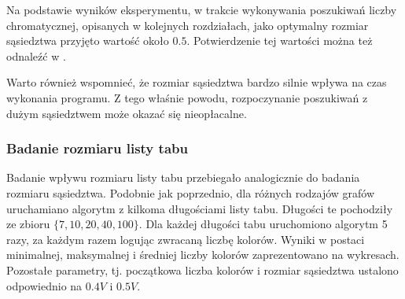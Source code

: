 \documentclass[12pt,a4paper]{article}
\begin{document}
Na podstawie wyników eksperymentu, w trakcie wykonywania poszukiwań liczby chromatycznej, opisanych w kolejnych rozdziałach, jako optymalny rozmiar sąsiedztwa przyjęto wartość około $0.5$. Potwierdzenie tej wartości można też odnaleźć w \cite{Hertz1987}.

Warto również wspomnieć, że rozmiar sąsiedztwa bardzo silnie wpływa na czas wykonania programu. Z tego właśnie powodu, rozpoczynanie poszukiwań z dużym sąsiedztwem może okazać się nieopłacalne.

\subsubsection{Badanie rozmiaru listy tabu}
Badanie wpływu rozmiaru listy tabu przebiegało analogicznie do badania rozmiaru sąsiedztwa. Podobnie jak poprzednio, dla różnych rodzajów grafów uruchamiano algorytm z kilkoma długościami listy tabu. Długości te pochodziły ze zbioru $\lbrace7,10,20,40,100\rbrace$. Dla każdej długości tabu uruchomiono algorytm 5 razy, za każdym razem logując zwracaną liczbę kolorów. Wyniki w postaci minimalnej, maksymalnej i średniej liczby kolorów zaprezentowano na wykresach. Pozostałe parametry, tj. początkowa liczba kolorów i rozmiar sąsiedztwa ustalono odpowiednio na $0.4V$ i $0.5V$.
\end{document}

